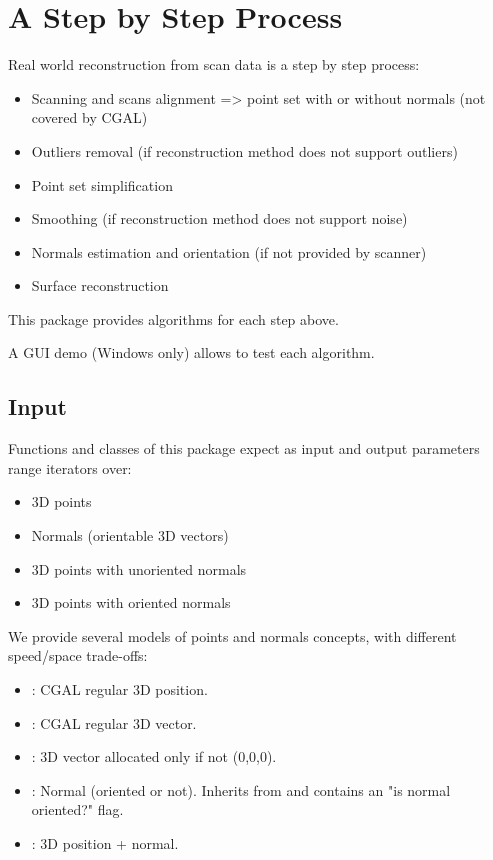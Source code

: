 \section{A Step by Step Process}

Real world reconstruction from scan data is a step by step process:

\begin{itemize}
\item Scanning and scans alignment => point set with or without normals (not covered by CGAL)
\item Outliers removal (if reconstruction method does not support outliers)
\item Point set simplification
\item Smoothing (if reconstruction method does not support noise)
\item Normals estimation and orientation (if not provided by scanner)
\item Surface reconstruction
\end{itemize}

This package provides algorithms for each step above.

A GUI demo (Windows only) allows to test each algorithm.


\subsection{Input}

Functions and classes of this package expect as input and output parameters range iterators over:

\begin{itemize}
\item 3D points
\item Normals (orientable 3D vectors)
\item 3D points with unoriented normals
\item 3D points with oriented normals
\end{itemize}

We provide several models of points and normals concepts, with different speed/space trade-offs:

\begin{itemize}
\item {}: CGAL regular 3D position.
\item {}: CGAL regular 3D vector.
\item {}: 3D vector allocated only if not (0,0,0).
\item {}: Normal (oriented or not).
Inherits from  and contains an "is normal oriented?" flag.
\item {}: 3D position + normal.
\end{itemize}

